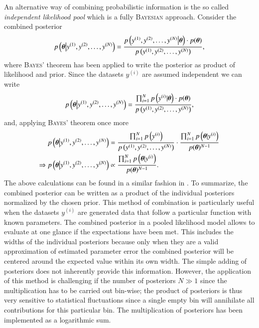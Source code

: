An alternative way of combining probabilistic information is the so called \emph{independent likelihood pool} \cite{likpool} which is a fully \textsc{Bayesian} approach. Consider the combined posterior
\begin{equation}
	p\left(\boldsymbol{\theta}\big|y^{(1)},y^{(2)},\dots,y^{(N)}\right)=\frac{p\left(y^{(1)},y^{(2)},\dots,y^{(N)}\big|\boldsymbol{\theta}\right)\cdot p(\boldsymbol{\theta})}{p\left(y^{(1)},y^{(2)},\dots,y^{(N)}\right)},
\end{equation}
where \textsc{Bayes'} theorem has been applied to write the posterior as product of likelihood and prior. Since the datasets $y^{(i)}$ are assumed independent we can write
\begin{equation}
	p\left(\boldsymbol{\theta}\big|y^{(1)},y^{(2)},\dots,y^{(N)}\right)=\frac{\prod_{i=1}^{N}p\left(y^{(i)}|\boldsymbol{\theta}\right)\cdot p(\boldsymbol{\theta})}{p\left(y^{(1)},y^{(2)},\dots,y^{(N)}\right)},
\end{equation}
and, applying \textsc{Bayes'} theorem once more
\begin{align}
	p\left(\boldsymbol{\theta}\big|y^{(1)},y^{(2)},\dots,y^{(N)}\right)&=\frac{\prod_{i=1}^{N}p\left(y^{(i)}\right)}{p\left(y^{(1)},y^{(2)},\dots,y^{(N)}\right)}\cdot\frac{\prod_{i=1}^{N}p\left(\boldsymbol{\theta} |y^{(i)}\right)}{p(\boldsymbol{\theta}) ^{N-1}}\\
	\Rightarrow p\left(\boldsymbol{\theta}\big|y^{(1)},y^{(2)},\dots,y^{(N)}\right)&\propto\frac{\prod_{i=1}^{N}p\left(\boldsymbol{\theta} |y^{(i)}\right)}{p(\boldsymbol{\theta}) ^{N-1}}.
\end{align}
The above calculations can be found in a similar fashion in \cite{probcomb}. To summarize, the combined posterior can be written as a product of the individual posteriors normalized by the chosen prior. This method of combination is particularly useful when the datasets $y^{(i)}$ are generated data that follow a particular function with known parameters. The combined posterior in a pooled likelihood model allows to evaluate at one glance if the expectations have been met. This includes the widths of the individual posteriors because only when they are a valid approximation of estimated parameter error the combined posterior will be centered around the expected value within its own width. The simple adding of posteriors does not inherently provide this information. However, the application of this method is challenging if the number of posteriors $N\gg1$ since the multiplication has to be carried out bin-wise; the product of posteriors is thus very sensitive to statistical fluctuations since a single empty bin will annihilate all contributions for this particular bin. The multiplication of posteriors has been implemented as a logarithmic sum. 

